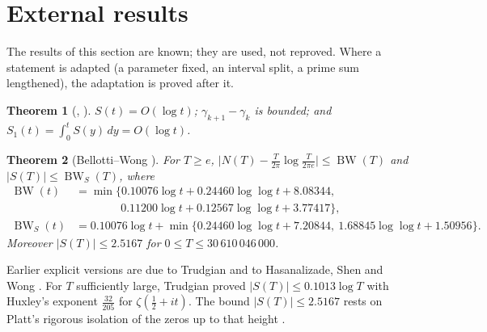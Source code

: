 \documentclass[preprint,12pt]{elsarticle}
\numberwithin{equation}{section}
\theoremstyle{plain}
\newtheorem{theorem}{Theorem}[section]
\theoremstyle{definition}
\theoremstyle{remark}
\newcommand{\BW}{\operatorname{BW}}
\newcommand{\BWS}{\operatorname{BW}_S}
\begin{document}

\section{External results}
\label{sec:known_results}

The results of this section are known; they are used, not reproved. Where a statement is adapted (a parameter fixed, an interval split, a prime sum lengthened), the adaptation is proved after it.


\begin{theorem}[{\cite[Thms.~9.4, 9.9 and \S9.12]{Titchmarsh1986}}, {\cite{Littlewood1924}}]\label{thm:known_basic}
$S(t)=O(\log t)$; $\gamma_{k+1}-\gamma_k$ is bounded; and $S_1(t)=\int_0^tS(y)\,dy=O(\log t)$.
\end{theorem}

\begin{theorem}[Bellotti--Wong {\cite[Thm.~1.1, Cor.~1.5 and (1.2)]{BellottiWong2025}}]\label{thm:known_BW}
For $T\ge e$, $\bigl|N(T)-\frac T{2\pi}\log\frac T{2\pi e}\bigr|\le\BW(T)$ and $|S(T)|\le\BWS(T)$, where
\begin{equation}
\begin{split}
\BW(t)&=\min\{0.10076\log t+0.24460\log\log t+8.08344,\\
&\qquad\qquad0.11200\log t+0.12567\log\log t+3.77417\},\\
\BWS(t)&=0.10076\log t+\min\{0.24460\log\log t+7.20844,\ 1.68845\log\log t+1.50956\}.
\end{split}
\label{eq:BWS_def}
\end{equation}
Moreover $|S(T)|\le2.5167$ for $0\le T\le30\,610\,046\,000$.
\end{theorem}
Earlier explicit versions are due to Trudgian \cite{Trudgian2014} and to Hasanalizade, Shen and Wong \cite{HasanalizadeShenWong2022}. For $T$ sufficiently large, Trudgian \cite[\S5 of the preprint]{Trudgian2010} proved $|S(T)|\le0.1013\log T$ with Huxley\textquoteright s exponent $\frac{32}{205}$ for $\zeta(\frac12+it)$. The bound $|S(T)|\le2.5167$ rests on Platt's rigorous isolation of the zeros up to that height \cite[(1.2)]{BellottiWong2025}.
\end{document}
